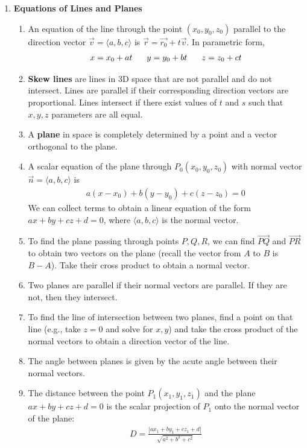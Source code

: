 \documentclass[10pt]{article}
\begin{document}
\begin{multicols}{2}
\begin{enumerate}
\item \textbf{Equations of Lines and Planes}
\begin{enumerate}
    \item An equation of the line through the point $(x_0, y_0, z_0)$ parallel to the direction vector $\vec{v} = \langle a, b, c \rangle$ is $\vec{r} = \vec{r_0} + t\vec{v}$. In parametric form,
    \begin{align*}
        x = x_0 + at \hspace{6mm}
        y = y_0 + bt \hspace{6mm}
        z = z_0 + ct
    \end{align*}
    
    \item \textbf{Skew lines} are lines in 3D space that are not parallel and do not intersect. Lines are parallel if their corresponding direction vectors are proportional. Lines intersect if there exist values of $t$ and $s$ such that $x,y,z$ parameters are all equal.
    
    \item A \textbf{plane} in space is completely determined by a point and a vector orthogonal to the plane. 
    \item A scalar equation of the plane through $P_0(x_0, y_0, z_0)$ with normal vector $\vec{n} = \langle a,b,c \rangle$ is 
    \begin{align*}
        a(x-x_0) + b(y-y_0) + c(z-z_0) = 0
    \end{align*}
    We can collect terms to obtain a linear equation of the form $ax+by+cz+d=0$, where $\langle a,b,c \rangle$ is the normal vector.
    \item To find the plane passing through points $P,Q,R$, we can find $\vec{PQ}$ and $\vec{PR}$ to obtain two vectors on the plane (recall the vector from $A$ to $B$ is $B-A$). Take their cross product to obtain a normal vector.
    \item Two planes are parallel if their normal vectors are parallel. If they are not, then they intersect. 
    \item To find the line of intersection between two planes, find a point on that line (e.g., take $z=0$ and solve for $x,y$) and take the cross product of the normal vectors to obtain a direction vector of the line. 
    \item The angle between planes is given by the acute angle between their normal vectors.
    \item The distance between the point $P_1(x_1,y_1,z_1)$ and the plane $ax+by+cz+d=0$ is the scalar projection of $P_1$ onto the normal vector of the plane:
    \begin{align*}
        D = \frac{|ax_1 + by_1+cz_1+d|}{\sqrt{a^2+b^2+c^2}}
    \end{align*}
\end{enumerate}


\end{enumerate}
\end{multicols}
\end{document}
